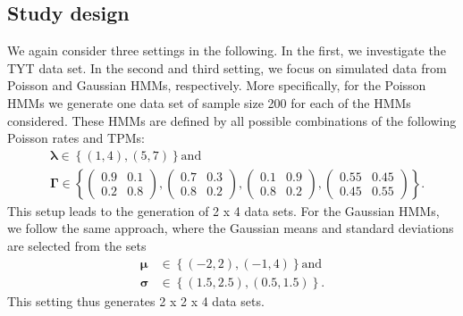 \documentclass[]{interact}\usepackage[]{graphicx}\usepackage[dvipsnames]{xcolor}
\theoremstyle{plain}%
\theoremstyle{definition}
\theoremstyle{remark}
\begin{document}
\subsection{Study design}
\label{sec:robustness-design}

We again consider three settings in the following. In the first, we investigate the TYT data set. In the second and third setting, we focus on simulated data from Poisson and Gaussian HMMs, respectively. More specifically, for the Poisson HMMs we generate one data set of sample size 200 for each of the HMMs considered. These HMMs are defined by all possible combinations of the following Poisson rates and TPMs:
\begin{align*}
& \bm{\lambda} \in \left\{ (1, 4), (5, 7) \right\} \text{and}\\
& \bm{\Gamma} \in \left\{ \begin{pmatrix} 0.9 & 0.1 \\ 0.2 & 0.8 \end{pmatrix}, \begin{pmatrix} 0.7 & 0.3 \\ 0.8 & 0.2 \end{pmatrix}, \begin{pmatrix} 0.1 & 0.9 \\ 0.8 & 0.2 \end{pmatrix}, \begin{pmatrix} 0.55 & 0.45 \\ 0.45 & 0.55 \end{pmatrix} \right\}.
\end{align*}
This setup leads to the generation of 2 x 4 data sets. For the Gaussian HMMs, we follow the same approach, %
where the Gaussian means and standard deviations are selected from the sets
\begin{align*}
\bm{\mu} &\in \left\{ (-2, 2), (-1, 4) \right\} \text{and}\\
\bm{\sigma} &\in \left\{ (1.5, 2.5), (0.5, 1.5) \right\}.
\end{align*}
This setting thus generates 2 x 2 x 4 data sets.
\end{document}
